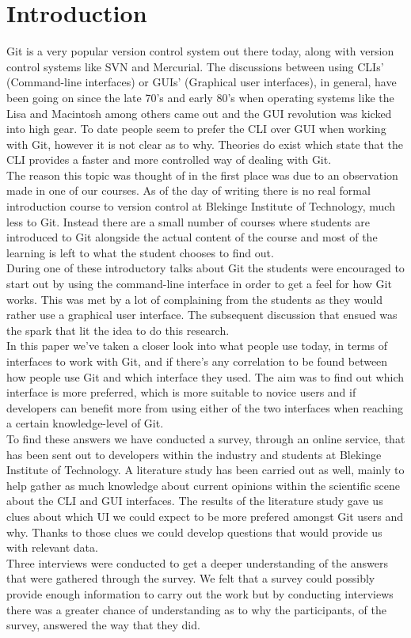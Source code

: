\documentclass[a4paper,oneside]{bth} %
\begin{document}
		\chapter{Introduction}
		Git is a very popular version control system out there today, along with version control systems like SVN and Mercurial. The discussions between using CLIs' (Command-line interfaces) or GUIs' (Graphical user interfaces), in general, have been going on since the late 70's and early 80's when operating systems like the Lisa and Macintosh among others came out \cite{HistoryOfGUIWiki} and the GUI revolution was kicked into high gear.
		To date people seem to prefer the CLI over GUI when working with Git, however it is not clear as to why.
		Theories do exist which state that the CLI provides a faster and more controlled way of dealing with Git. \cite{GitUserSurvey}\cite{GitInClassroom}
		\\
		The reason this topic was thought of in the first place was due to an observation made in one of our courses. As of the day of writing there is no real formal introduction course to version control at Blekinge Institute of Technology, much less to Git. Instead there are a small number of courses where students are introduced to Git alongside the actual content of the course and most of the learning is left to what the student chooses to find out.\\
		During one of these introductory talks about Git the students were encouraged to start out by using the command-line interface in order to get a feel for how Git works. This was met by a lot of complaining from the students as they would rather use a graphical user interface. The subsequent discussion that ensued was the spark that lit the idea to do this research.
		\\
		In this paper we've taken a closer look into what people use today, in terms of interfaces to work with Git, and if there's any correlation to be found between how people use Git and which interface they used.
		The aim was to find out which interface is more preferred, which is more suitable to novice users and if developers can benefit more from using either of the two interfaces when reaching a certain knowledge-level of Git.\\
		To find these answers we have conducted a survey, through an online service, that has been sent out to developers within the industry and students at Blekinge Institute of Technology.
		A literature study has been carried out as well, mainly to help  gather as much knowledge about current opinions within the scientific scene about the CLI and GUI interfaces.
		The results of the literature study gave us clues about which UI we could expect to be more prefered amongst Git users and why. Thanks to those clues we could develop questions that would provide us with relevant data.\\
		Three interviews were conducted to get a deeper understanding of the answers that were gathered through the survey.
		We felt that a survey could possibly provide enough information to carry out the work but by conducting interviews there was a greater chance of understanding as to why the participants, of the survey, answered the way that they did.
		
\end{document}

